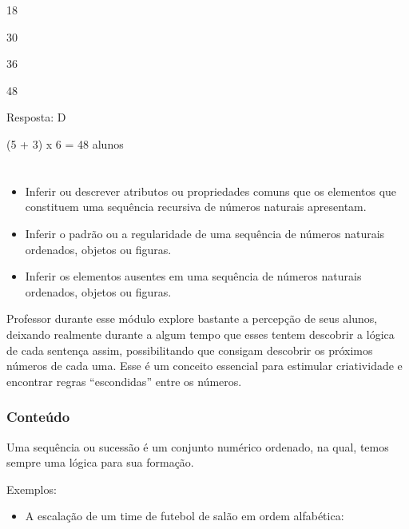 \begin{escolha}

\item
  18
\item
  30
\item
  36
\item
  48
\end{escolha}

Resposta: D

(5 + 3) x 6 = 48 alunos

\chapter{}



\begin{itemize}
    \item Inferir ou descrever atributos ou propriedades comuns que os elementos
que constituem uma sequência recursiva de números naturais apresentam.

    \item Inferir o padrão ou a regularidade de uma sequência de números
naturais ordenados, objetos ou figuras.

    \item Inferir os elementos ausentes em uma sequência de números naturais
ordenados, objetos ou figuras.
\end{itemize}

Professor durante esse módulo explore bastante a percepção de seus
alunos, deixando realmente durante a algum tempo que esses tentem
descobrir a lógica de cada sentença assim, possibilitando que consigam
descobrir os próximos números de cada uma. Esse é um conceito essencial
para estimular criatividade e encontrar regras ``escondidas'' entre os
números.

\subsection{Conteúdo}\label{conteuxfado-2}

Uma sequência ou sucessão é um conjunto numérico ordenado, na qual,
temos sempre uma lógica para sua formação.

Exemplos:

\begin{itemize}
\item
  A escalação de um time de futebol de salão em ordem alfabética:
\end{itemize}

